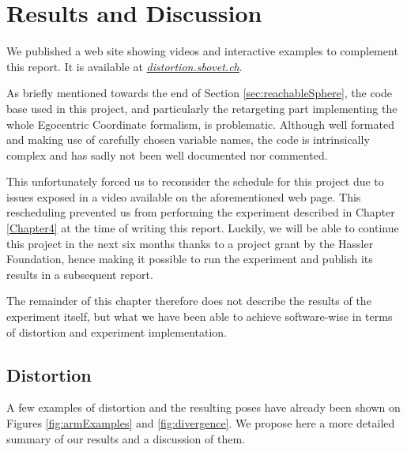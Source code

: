 
\chapter{Results and Discussion}
\label{Chapter5}

We published a web site showing videos and interactive examples to complement this report. It is available at \href{https://distortion.sbovet.ch/}{\textit{distortion.sbovet.ch}}.

As briefly mentioned towards the end of Section \ref{sec:reachableSphere}, the code base used in this project, and particularly the retargeting part implementing the whole Egocentric Coordinate formalism, is problematic. Although well formated and making use of carefully chosen variable names, the code is intrinsically complex and has sadly not been well documented nor commented.

This unfortunately forced us to reconsider the schedule for this project due to issues exposed in a video available on the aforementioned web page. This rescheduling prevented us from performing the experiment described in Chapter \ref{Chapter4} at the time of writing this report. Luckily, we will be able to continue this project in the next six months thanks to a project grant by the Hassler Foundation, hence making it possible to run the experiment and publish its results in a subsequent report.

The remainder of this chapter therefore does not describe the results of the experiment itself, but what we have been able to achieve software-wise in terms of distortion and experiment implementation.

\section{Distortion}

A few examples of distortion and the resulting poses have already been shown on Figures \ref{fig:armExamples} and \ref{fig:divergence}. We propose here a more detailed summary of our results and a discussion of them.


